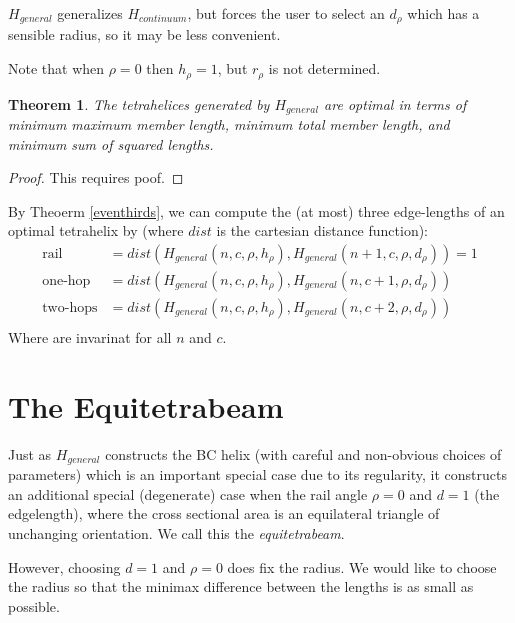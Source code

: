 \documentclass[11pt]{article}
\newtheorem{theorem}{Theorem}
\begin{document}
$H_{general}$ generalizes $H_{continuum}$, but forces the user to select an $d_{\rho}$
which has a sensible radius, so it may be less convenient.

Note that when $\rho = 0$ then $h_{\rho} = 1$, but $r_{\rho}$ is not determined.

\begin{theorem}
  \label{generalformulaoptimal}
  The tetrahelices generated by $H_{general}$ are optimal in terms of minimum maximum member length, minimum total member length, and minimum
  sum of squared lengths.
\end{theorem}


\begin{proof}
  This requires poof.
\end{proof}

By Theoerm \ref{eventhirds}, we can compute the (at most) three edge-lengths of an optimal
tetrahelix by (where $dist$ is the cartesian distance function):
\begin{align*}
  \text{rail} &= dist(H_{general}(n,c,\rho,h_{\rho}),H_{general}(n+1,c,\rho,d_{\rho})) = 1 \\
  \text{one-hop} &= dist(H_{general}(n,c,\rho,h_{\rho}),H_{general}(n,c+1,\rho,d_{\rho}))  \\
  \text{two-hops} &= dist(H_{general}(n,c,\rho,h_{\rho}),H_{general}(n,c+2,\rho,d_{\rho}))  \\  
\end{align*}
Where are invarinat for all $n$ and $c$.


\section{The Equitetrabeam}

Just as $H_{general}$ constructs the BC helix (with careful and non-obvious choices of parameters) which is an important
special case due to its regularity, it constructs an additional special (degenerate) case when the rail angle $\rho = 0$
and $d = 1$ (the edgelength), where the cross sectional area is an equilateral triangle of unchanging orientation.
We call this the \emph{equitetrabeam}.

However, choosing $d = 1$ and $\rho = 0$ does fix the radius. We would like to choose the radius so that the
minimax difference between the lengths is as small as possible.
\end{document}
